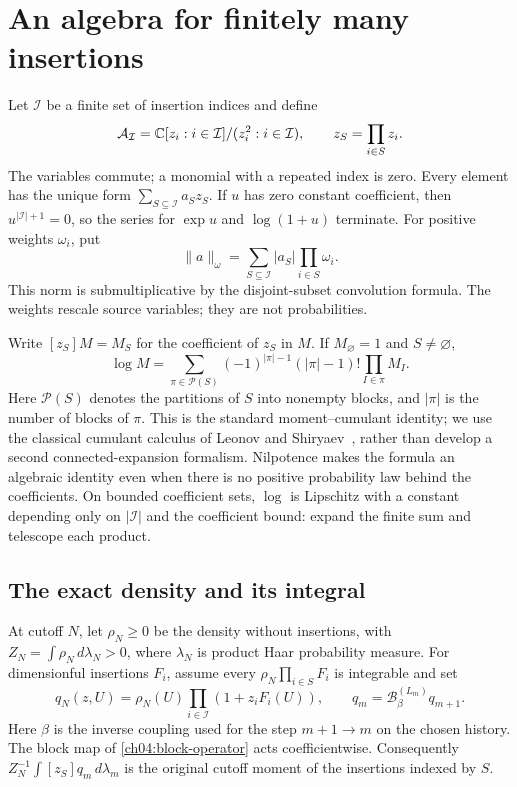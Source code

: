 \section{An algebra for finitely many insertions}

Let $\mathcal I$ be a finite set of insertion indices and define
\[
 \mathcal A_{\mathcal I}
 =\mathbb C[z_i:i\in\mathcal I]/(z_i^2:i\in\mathcal I),\qquad
 z_S=\prod_{i\in S}z_i.
\]
The variables commute; a monomial with a repeated index is zero.
Every element has the unique form $\sum_{S\subseteq\mathcal I}a_Sz_S$.
If $u$ has zero constant coefficient, then $u^{|\mathcal I|+1}=0$,
so the series for $\exp u$ and $\log(1+u)$ terminate.
For positive weights $\omega_i$, put
\[
 \|a\|_{\omega}=\sum_{S\subseteq\mathcal I}
                         |a_S|\prod_{i\in S}\omega_i.
\]
This norm is submultiplicative by the disjoint-subset convolution
formula. The weights rescale source variables; they are not probabilities.

Write $[z_S]M=M_S$ for the coefficient of $z_S$ in $M$. If
$M_\varnothing=1$ and $S\ne\varnothing$,
\begin{equation}
 [z_S]\log M
 =\sum_{\pi\in\mathcal P(S)}
    (-1)^{|\pi|-1}(|\pi|-1)!\prod_{I\in\pi}M_I .
 \label{ch11:cumulants}
\end{equation}
Here $\mathcal P(S)$ denotes the partitions of $S$ into nonempty blocks,
and $|\pi|$ is the number of blocks of $\pi$.
This is the standard moment--cumulant identity; we use the classical
cumulant calculus of Leonov and Shiryaev~\cite{LeonovShiryaev1959},
rather than develop a second connected-expansion formalism.
Nilpotence makes the formula an algebraic identity even when there
is no positive probability law behind the coefficients.
On bounded coefficient sets, $\log$ is Lipschitz with a constant
depending only on $|\mathcal I|$ and the coefficient bound:
expand the finite sum and telescope each product.

\subsection{The exact density and its integral}

At cutoff $N$, let $\rho_N\ge0$ be the density without insertions, with
$Z_N=\int\rho_N\,d\lambda_N>0$, where $\lambda_N$ is product Haar
probability measure. For dimensionful insertions $F_i$, assume every
$\rho_N\prod_{i\in S}F_i$ is integrable and set
\begin{equation}
 q_N(z,U)=\rho_N(U)\prod_{i\in\mathcal I}(1+z_iF_i(U)),
 \qquad q_m=\mathcal B^{(L_m)}_\beta q_{m+1}.
 \label{ch11:source-density}
\end{equation}
Here $\beta$ is the inverse coupling used for the step $m+1\to m$ on the chosen history. The block map of \eqref{ch04:block-operator} acts coefficientwise. Consequently
$Z_N^{-1}\int[z_S]q_m\,d\lambda_m$ is the original cutoff moment
of the insertions indexed by $S$.

